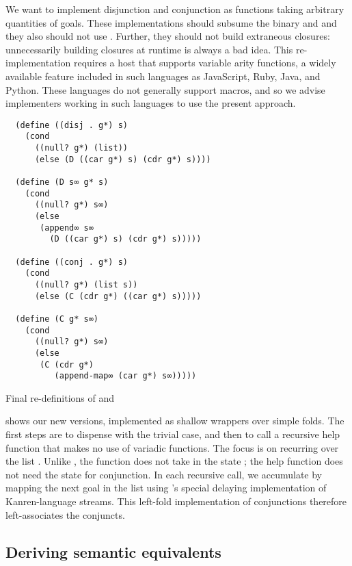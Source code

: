 \documentclass[sigplan,balance=true,pbalance=true,natbib=false]{acmart}
\begin{document}
We want to implement disjunction and conjunction as functions taking
arbitrary quantities of goals. These implementations should subsume
the binary  and  and they also
should not use . Further, they should not build
extraneous closures: unnecessarily building closures at runtime is
always a bad idea. This re-implementation requires a host that
supports variable arity functions, a widely available feature included
in such languages as JavaScript, Ruby, Java, and Python. These
languages do not generally support macros, and so we advise
implementers working in such languages to use the present approach.

\begin{listing}
\begin{verbatim}
  (define ((disj . g*) s)
    (cond
      ((null? g*) (list))
      (else (D ((car g*) s) (cdr g*) s))))

  (define (D s∞ g* s)
    (cond
      ((null? g*) s∞)
      (else
       (append∞ s∞
         (D ((car g*) s) (cdr g*) s)))))

  (define ((conj . g*) s)
    (cond
      ((null? g*) (list s))
      (else (C (cdr g*) ((car g*) s)))))

  (define (C g* s∞)
    (cond
      ((null? g*) s∞)
      (else
       (C (cdr g*)
          (append-map∞ (car g*) s∞)))))
\end{verbatim}
  \caption{Final re-definitions of  and }\label{mnt:disj-reimplementation}
\end{listing}

 shows our new versions, implemented
as shallow wrappers over simple folds. The first steps are to dispense
with the trivial case, and then to call a recursive help function that
makes no use of variadic functions. The focus is on recurring over the
list . Unlike , the
function  does not take in the state ; the
help function does not need the state for conjunction. In each
recursive call, we accumulate by mapping the next goal in the list
using 's special delaying implementation of
Kanren-language streams. This left-fold implementation of
conjunctions therefore left-associates the conjuncts.

\subsection{Deriving semantic equivalents}
\end{document}
